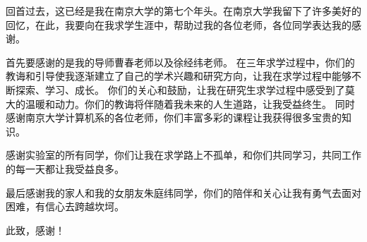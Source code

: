 回首过去，这已经是我在南京大学的第七个年头。在南京大学我留下了许多美好的回忆，在此，我要向在我求学生涯中，帮助过我的各位老师，各位同学表达我的感谢。

首先要感谢的是我的导师曹春老师以及徐经纬老师。
在三年求学过程中，你们的教诲和引导使我逐渐建立了自己的学术兴趣和研究方向，让我在求学过程中能够不断探索、学习、成长。
你们的关心和鼓励，让我在研究生求学过程中感受到了莫大的温暖和动力。你们的教诲将伴随着我未来的人生道路，让我受益终生。
同时感谢南京大学计算机系的各位老师，你们丰富多彩的课程让我获得很多宝贵的知识。

感谢实验室的所有同学，你们让我在求学路上不孤单，和你们共同学习，共同工作的每一天都让我受益良多。

最后感谢我的家人和我的女朋友朱庭纬同学，你们的陪伴和关心让我有勇气去面对困难，有信心去跨越坎坷。

此致，感谢！



